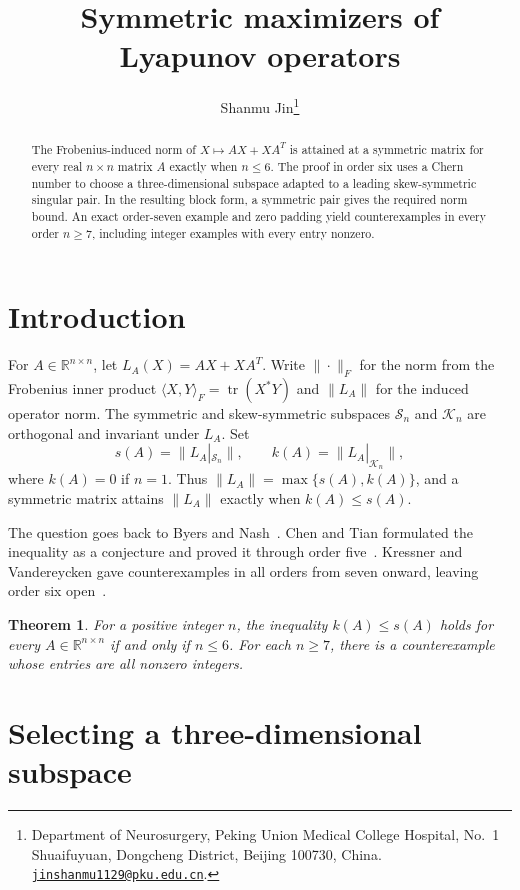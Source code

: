 \documentclass[11pt,letterpaper]{article}
\title{Symmetric maximizers of Lyapunov operators}
\author{Shanmu Jin\thanks{Department of Neurosurgery, Peking Union Medical College
  Hospital, No.~1 Shuaifuyuan, Dongcheng District, Beijing
  100730, China.
  \href{mailto:jinshanmu1129@pku.edu.cn}{\nolinkurl{jinshanmu1129@pku.edu.cn}}.}}
\date{}
\newtheorem{theorem}{Theorem}
\newcommand{\R}{\mathbb R}
\newcommand{\Sym}{\mathcal S}
\newcommand{\Skew}{\mathcal K}
\newcommand{\ip}[2]{\langle #1,#2\rangle_F}
\begin{document}
\maketitle

\begin{abstract}
The Frobenius-induced norm of \(X\mapsto AX+XA^T\) is attained at a
symmetric matrix for every real \(n\times n\) matrix \(A\) exactly
when \(n\le 6\). The proof in order six uses a Chern number to choose
a three-dimensional subspace adapted to a leading skew-symmetric
singular pair. In the resulting block form, a symmetric pair gives
the required norm bound. An exact order-seven example and zero
padding yield counterexamples in every order \(n\ge7\), including
integer examples with every entry nonzero.
\end{abstract}

\section{Introduction}

For \(A\in\R^{n\times n}\), let \(L_A(X)=AX+XA^T\). Write
\(\|\cdot\|_F\) for the norm from the Frobenius inner product
\(\ip{X}{Y}=\operatorname{tr}(X^*Y)\) and \(\|L_A\|\) for the
induced operator norm. The symmetric
and skew-symmetric subspaces \(\Sym_n\) and \(\Skew_n\) are
orthogonal and invariant under \(L_A\). Set
\[
s(A)=\|L_A|_{\Sym_n}\|,\qquad k(A)=\|L_A|_{\Skew_n}\|,
\]
where \(k(A)=0\) if \(n=1\). Thus \(\|L_A\|=\max\{s(A),k(A)\}\),
and a symmetric matrix attains \(\|L_A\|\) exactly when \(k(A)\le s(A)\).

The question goes back to Byers and Nash~\cite{byers-nash}. Chen and
Tian formulated the inequality as a conjecture and proved it
through order five~\cite{chen-tian}. Kressner and Vandereycken gave
counterexamples in all orders from seven onward, leaving order six
open~\cite{kressner-vandereycken}.

\begin{theorem}\label{thm:main}
For a positive integer \(n\), the inequality \(k(A)\le s(A)\)
holds for every \(A\in\R^{n\times n}\) if and only if \(n\le6\).
For each \(n\ge7\), there is a counterexample whose entries are
all nonzero integers.
\end{theorem}

\section{Selecting a three-dimensional subspace}\label{sec:selection}
\end{document}
